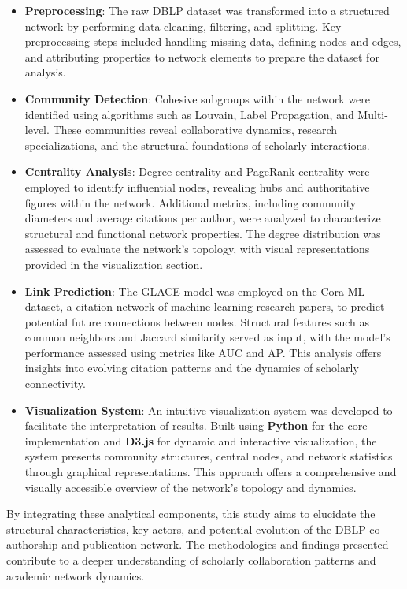 \documentclass[11pt]{article}
\begin{document}
\begin{itemize}
	\item \textbf{Preprocessing}: The raw DBLP dataset was transformed into a structured network by performing data cleaning, filtering, and splitting. Key preprocessing steps included handling missing data, defining nodes and edges, and attributing properties to network elements to prepare the dataset for analysis.
	\item \textbf{Community Detection}: Cohesive subgroups within the network were identified using algorithms such as Louvain, Label Propagation, and Multi-level. These communities reveal collaborative dynamics, research specializations, and the structural foundations of scholarly interactions.
	\item \textbf{Centrality Analysis}: Degree centrality and PageRank centrality were employed to identify influential nodes, revealing hubs and authoritative figures within the network. Additional metrics, including community diameters and average citations per author, were analyzed to characterize structural and functional network properties. The degree distribution was assessed to evaluate the network's topology, with visual representations provided in the visualization section.
	\item \textbf{Link Prediction}: The GLACE model was employed on the Cora-ML dataset, a citation network of machine learning research papers, to predict potential future connections between nodes. Structural features such as common neighbors and Jaccard similarity served as input, with the model’s performance assessed using metrics like AUC and AP. This analysis offers insights into evolving citation patterns and the dynamics of scholarly connectivity.
	\item \textbf{Visualization System}: An intuitive visualization system was developed to facilitate the interpretation of results. Built using \textbf{Python} for the core implementation and \textbf{D3.js} for dynamic and interactive visualization, the system presents community structures, central nodes, and network statistics through graphical representations. This approach offers a comprehensive and visually accessible overview of the network's topology and dynamics.
\end{itemize}

By integrating these analytical components, this study aims to elucidate the structural characteristics, key actors, and potential evolution of the DBLP co-authorship and publication network. The methodologies and findings presented contribute to a deeper understanding of scholarly collaboration patterns and academic network dynamics.
\end{document}
